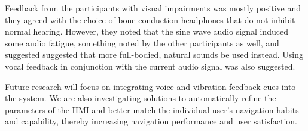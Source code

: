 \documentclass[sigconf, review=true, screen=true, anonymous=true]{acmart}
\begin{document}
Feedback from the participants with visual impairments was mostly positive and they agreed with the choice of bone-conduction headphones that do not inhibit normal hearing. However, they noted that the sine wave audio signal induced some audio fatigue, something noted by the other participants as well, and suggested suggested that more full-bodied, natural sounds be used instead. Using vocal feedback in conjunction with the current audio signal was also suggested. 

Future research will focus on integrating voice and vibration feedback cues into the system. We are also investigating solutions to automatically refine the parameters of the HMI and better match the individual user's navigation habits and capability, thereby increasing navigation performance and user satisfaction.



\end{document}
